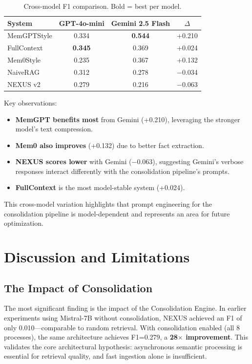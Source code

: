 \documentclass[conference]{IEEEtran}
\begin{document}
\begin{table}[ht]
\caption{Cross-model F1 comparison. Bold = best per model.}
\label{tab:cross_model}
\begin{center}
\begin{tabular}{lccc}
\toprule
\textbf{System} & \textbf{GPT-4o-mini} & \textbf{Gemini 2.5 Flash} & \textbf{$\Delta$} \\
\midrule
MemGPTStyle & 0.334 & \textbf{0.544} & +0.210 \\
FullContext & \textbf{0.345} & 0.369 & +0.024 \\
Mem0Style & 0.235 & 0.367 & +0.132 \\
NaiveRAG & 0.312 & 0.278 & $-$0.034 \\
NEXUS v2 & 0.279 & 0.216 & $-$0.063 \\
\bottomrule
\end{tabular}
\end{center}
\end{table}

Key observations:
\begin{itemize}
    \item \textbf{MemGPT benefits most} from Gemini (+0.210), leveraging the stronger model's text compression.
    \item \textbf{Mem0 also improves} (+0.132) due to better fact extraction.
    \item \textbf{NEXUS scores lower} with Gemini ($-$0.063), suggesting Gemini's verbose responses interact differently with the consolidation pipeline's prompts.
    \item \textbf{FullContext} is the most model-stable system (+0.024).
\end{itemize}
This cross-model variation highlights that prompt engineering for the consolidation pipeline is model-dependent and represents an area for future optimization.

\section{Discussion and Limitations}

\subsection{The Impact of Consolidation}
The most significant finding is the impact of the Consolidation Engine. In earlier experiments using Mistral-7B without consolidation, NEXUS achieved an F1 of only 0.010---comparable to random retrieval. With consolidation enabled (all 8 processes), the same architecture achieves F1=0.279, a \textbf{28$\times$ improvement}. This validates the core architectural hypothesis: asynchronous semantic processing is essential for retrieval quality, and fast ingestion alone is insufficient.
\end{document}
